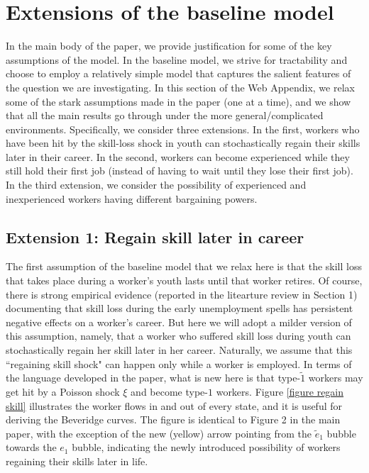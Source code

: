 \documentclass[12pt]{article} %
\theoremstyle{definition}
\begin{document}



\section{Extensions of the baseline model}

In the main body of the paper, we provide justification for some of the key assumptions of the model. In the baseline model, we strive for tractability and choose to employ a relatively simple model that captures the salient features of the question we are investigating. In this section of the Web Appendix, we relax some of the stark assumptions made in the paper (one at a time), and we show that all the main results go through under the more general/complicated environments. Specifically, we consider three extensions. In the first, workers who have been hit by the skill-loss shock in youth can stochastically regain their skills later in their career. In the second, workers can become experienced while they still hold their first job (instead of having to wait until they lose their first job). In the third extension, we consider the possibility of experienced and inexperienced workers having different bargaining powers.  


\subsection{Extension 1: Regain skill later in career}

The first assumption of the baseline model that we relax here is that the skill loss that takes place during a worker's youth lasts until that worker retires. Of course, there is strong empirical evidence (reported in the litearture review in Section 1) documenting that skill loss during the
early unemployment spells has persistent negative effects on a worker's career. But here we will adopt a milder version of this assumption, namely, that a worker who suffered skill loss during youth can stochastically regain her skill later in her career. Naturally, we assume that this ``regaining skill shock" can happen only while a worker is employed. In terms of the language developed in the paper, what is new here is that type-$\tilde{1}$ workers may get hit by a Poisson shock $\xi$ and become type-$1$ workers. Figure \ref{figure regain skill}
illustrates the worker flows in and out of every state, and it is useful for deriving the Beveridge curves. The figure is identical to Figure 2 in the main paper, with the exception of the new (yellow) arrow pointing from the $\tilde{e}_1$ bubble towards the $e_1$ bubble, indicating the newly introduced possibility of workers regaining their skills later in life. 
\end{document}
